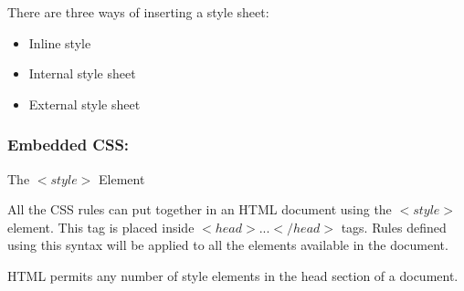 \documentclass[11pt,a4paper]{article}
\begin{document}
There are three ways of inserting a style sheet:
\begin{itemize}
\item Inline style
\item Internal style sheet
\item External style sheet
\end{itemize}

\subsubsection*{Embedded CSS:} The $<style>$ Element

 All the CSS rules can put together in an HTML document using the $<style>$ element. This tag is placed inside $<head>...</head>$ tags. Rules defined using this syntax will be applied to all the elements available in the document.

HTML permits any number of style elements in the head section of a document.
\end{document}
